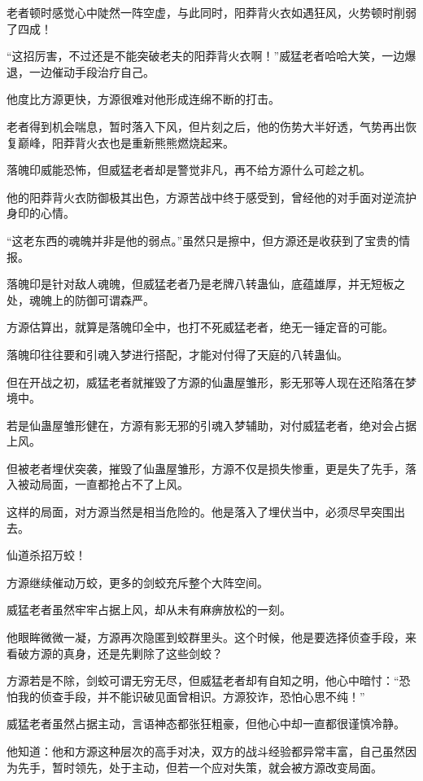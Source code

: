 \begin{this_body}
老者顿时感觉心中陡然一阵空虚，与此同时，阳莽背火衣如遇狂风，火势顿时削弱了四成！

“这招厉害，不过还是不能突破老夫的阳莽背火衣啊！”威猛老者哈哈大笑，一边爆退，一边催动手段治疗自己。

他度比方源更快，方源很难对他形成连绵不断的打击。

老者得到机会喘息，暂时落入下风，但片刻之后，他的伤势大半好透，气势再出恢复巅峰，阳莽背火衣也是重新熊熊燃烧起来。

落魄印威能恐怖，但威猛老者却是警觉非凡，再不给方源什么可趁之机。

他的阳莽背火衣防御极其出色，方源苦战中终于感受到，曾经他的对手面对逆流护身印的心情。

“这老东西的魂魄并非是他的弱点。”虽然只是擦中，但方源还是收获到了宝贵的情报。

落魄印是针对敌人魂魄，但威猛老者乃是老牌八转蛊仙，底蕴雄厚，并无短板之处，魂魄上的防御可谓森严。

方源估算出，就算是落魄印全中，也打不死威猛老者，绝无一锤定音的可能。

落魄印往往要和引魂入梦进行搭配，才能对付得了天庭的八转蛊仙。

但在开战之初，威猛老者就摧毁了方源的仙蛊屋雏形，影无邪等人现在还陷落在梦境中。

若是仙蛊屋雏形健在，方源有影无邪的引魂入梦辅助，对付威猛老者，绝对会占据上风。

但被老者埋伏突袭，摧毁了仙蛊屋雏形，方源不仅是损失惨重，更是失了先手，落入被动局面，一直都抢占不了上风。

这样的局面，对方源当然是相当危险的。他是落入了埋伏当中，必须尽早突围出去。

仙道杀招万蛟！

方源继续催动万蛟，更多的剑蛟充斥整个大阵空间。

威猛老者虽然牢牢占据上风，却从未有麻痹放松的一刻。

他眼眸微微一凝，方源再次隐匿到蛟群里头。这个时候，他是要选择侦查手段，来看破方源的真身，还是先剿除了这些剑蛟？

方源若是不除，剑蛟可谓无穷无尽，但威猛老者却有自知之明，他心中暗忖：“恐怕我的侦查手段，并不能识破见面曾相识。方源狡诈，恐怕心思不纯！”

威猛老者虽然占据主动，言语神态都张狂粗豪，但他心中却一直都很谨慎冷静。

他知道：他和方源这种层次的高手对决，双方的战斗经验都异常丰富，自己虽然因为先手，暂时领先，处于主动，但若一个应对失策，就会被方源改变局面。


\end{this_body}
